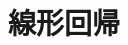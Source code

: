 \documentclass[../../topic_machine-learning]{subfiles}
\begin{document}
\chapter{線形回帰}


\end{document}
